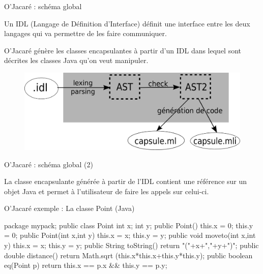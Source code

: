 \documentclass[xcolor={table,dvipsnames}]{beamer}
\begin{document}
\begin{frame}{O'Jacaré : schéma global }

\begin{definition}
Un \alert{IDL} (Langage de Définition d'Interface) définit une interface entre les deux langages qui va permettre de les faire communiquer.
\end{definition}

O'Jacaré génère les classes encapsulantes à partir d'un IDL dans lequel sont décrites les classes Java qu'on veut manipuler.
\medskip
\begin{figure}[h]
  \centering
  \includegraphics[scale=0.9]{schemaOjacare.png}
\end{figure}

\end{frame}


\begin{frame}{O'Jacaré : schéma global (2) }
  \begin{definition}
    La \alert{classe encapsulante} générée à partir de l'IDL contient une référence sur un objet Java et permet à l'utilisateur de faire les appels sur celui-ci.
  \end{definition}

\end{frame}





\begin{frame}[fragile]{O'Jacaré exemple : La classe Point (Java)}

\bigskip

\begin{javaEx} 
  package mypack;
  public class Point {
    int x;
    int y;
    public Point() { 
      this.x = 0;
      this.y = 0;
    }
    public Point(int x,int y) {
      this.x = x;
      this.y = y;
    }
    public void moveto(int x,int y){
      this.x = x;
      this.y = y;
    }
    public String toString() {
      return "("+x+","+y+")";
    }
    public double distance() {
      return Math.sqrt (this.x*this.x+this.y*this.y);
    }
    public boolean eq(Point p) {
      return this.x == p.x  && this.y == p.y;
    }
  }
\end{javaEx}

\end{frame}
\end{document}

